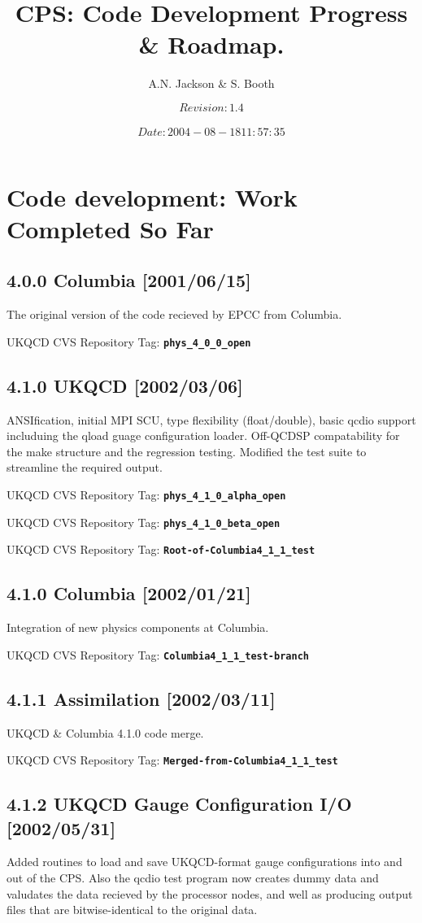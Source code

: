 \documentclass[12pt]{article}
\title{CPS: Code Development Progress \& Roadmap.}
\author{A.N. Jackson \& S. Booth}
\date{\mbox{\small $$Revision: 1.4 $$  $$Date: 2004-08-18 11:57:35 $$}}
\newcommand{\ukqcdtag}[1]{{\small{UKQCD CVS Repository Tag: }{\bf{\tt{#1}}}}}
\begin{document}
\maketitle

\tableofcontents
\newpage

\section{Code development: Work Completed So Far}

\subsection{4.0.0 Columbia [2001/06/15]}
The original version of the code recieved by EPCC from Columbia.

\ukqcdtag{phys\_4\_0\_0\_open}

\subsection{4.1.0  UKQCD [2002/03/06]}
ANSIfication, initial MPI SCU, type flexibility (float/double), basic qcdio
support includuing the qload guage configuration loader.  Off-QCDSP
compatability for the make structure and the regression testing.  Modified the
test suite to streamline the required output.

\ukqcdtag{phys\_4\_1\_0\_alpha\_open}

\ukqcdtag{phys\_4\_1\_0\_beta\_open}

\ukqcdtag{Root-of-Columbia4\_1\_1\_test}

\subsection{4.1.0 Columbia [2002/01/21]}
Integration of new physics components at Columbia.

\ukqcdtag{Columbia4\_1\_1\_test-branch}

\subsection{4.1.1 Assimilation [2002/03/11]}
UKQCD \& Columbia 4.1.0 code merge.

\ukqcdtag{Merged-from-Columbia4\_1\_1\_test}

\subsection{4.1.2 UKQCD Gauge Configuration I/O [2002/05/31]}
Added routines to load and save UKQCD-format gauge configurations into and out
of the CPS.  Also the qcdio test program now creates dummy data and valudates
the data recieved by the processor nodes, and well as producing output files
that are bitwise-identical to the original data.
\end{document}
